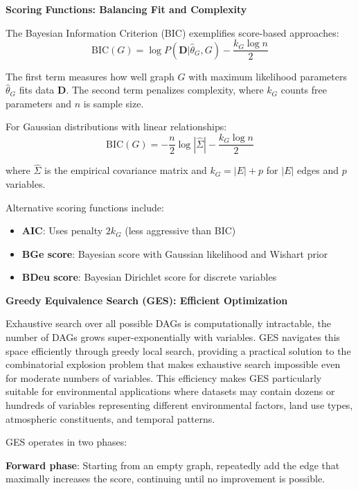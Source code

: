\textbf{Scoring Functions: Balancing Fit and Complexity}

The Bayesian Information Criterion (BIC) exemplifies score-based approaches:
\begin{equation}
	\text{BIC}(G) = \log P(\mathbf{D}|\hat{\theta}_G, G) - \frac{k_G \log n}{2}
\end{equation}

The first term measures how well graph $G$ with maximum likelihood parameters $\hat{\theta}_G$ fits data $\mathbf{D}$. The second term penalizes complexity, where $k_G$ counts free parameters and $n$ is sample size.

For Gaussian distributions with linear relationships:
\begin{equation}
	\text{BIC}(G) = -\frac{n}{2} \log|\hat{\Sigma}| - \frac{k_G \log n}{2}
\end{equation}

where $\hat{\Sigma}$ is the empirical covariance matrix and $k_G = |E| + p$ for $|E|$ edges and $p$ variables.

Alternative scoring functions include:
\begin{itemize}
	\item \textbf{AIC}: Uses penalty $2k_G$ (less aggressive than BIC)
	\item \textbf{BGe score}: Bayesian score with Gaussian likelihood and Wishart prior
	\item \textbf{BDeu score}: Bayesian Dirichlet score for discrete variables
\end{itemize}

\textbf{Greedy Equivalence Search (GES): Efficient Optimization}

Exhaustive search over all possible DAGs is computationally intractable, the number of DAGs grows super-exponentially with variables. GES navigates this space efficiently through greedy local search, providing a practical solution to the combinatorial explosion problem that makes exhaustive search impossible even for moderate numbers of variables. This efficiency makes GES particularly suitable for environmental applications where datasets may contain dozens or hundreds of variables representing different environmental factors, land use types, atmospheric constituents, and temporal patterns.

GES operates in two phases:

\textbf{Forward phase}: Starting from an empty graph, repeatedly add the edge that maximally increases the score, continuing until no improvement is possible.

